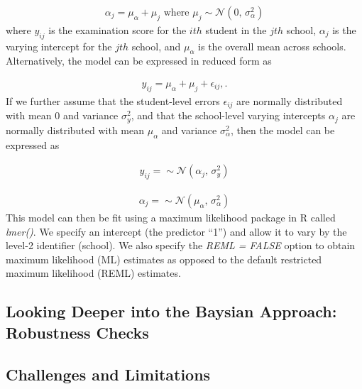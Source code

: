 \begin{align}
	\alpha_j = \mu_\alpha + \mu_j \text{ where } \mu_j \sim \mathcal{N}(0,\,\sigma^{2}_\alpha)
\end{align}
where $y_{ij}$ is the examination score for the $ith$ student in the $jth$ school, $\alpha_j$ is the varying intercept for the $jth$ school, and $\mu_\alpha$ is the overall mean across schools. Alternatively, the model can be expressed in reduced form as

\begin{align}
	y_{ij} = \mu_\alpha + \mu_j + \epsilon_{ij},.
\end{align}
If we further assume that the student-level errors $\epsilon_{ij}$ are normally distributed with mean $0$ and variance $\sigma^{2}_y$, and that the school-level varying intercepts $\alpha_j$ are normally distributed with mean $\mu_\alpha$ and variance $\sigma^{2}_\alpha$, then the model can be expressed as

\begin{align}
	y_{ij} =  \sim \mathcal{N}(\alpha_j,\,\sigma^{2}_y)
\end{align}

\begin{align}
	\alpha_j =  \sim \mathcal{N}(\mu_\alpha,\,\sigma^{2}_\alpha)
\end{align}
This model can then be fit using a maximum likelihood package in R called \textit{lmer()}. We specify an intercept (the predictor “1”) and allow it to vary by the level-2 identifier (school). We also specify the \textit{REML = FALSE} option to obtain maximum likelihood (ML) estimates as opposed to the default restricted maximum likelihood (REML) estimates.


\subsection{Looking Deeper into the Baysian Approach: Robustness Checks}

\subsection{Challenges and Limitations}






